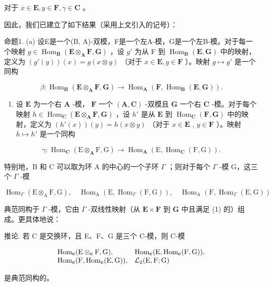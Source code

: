 对于 \(x \in \mathbf{E}, y \in \mathbf{F}, \gamma \in \mathbf{C}\) 。

因此，我们已建立了如下结果（采用上文引入的记号）：

命题1. (a) 设E是一个(B, A)-双模，F是一个左A-模，G是一个左B-模。对于每一个映射 \(g \in \operatorname{Hom}_{\mathbf{B}}(\mathbf{E} \otimes_{\mathbf{A}} \mathbf{F}, \mathbf{G})\) ，设 \(g'\) 为从 F 到 \(\operatorname{Hom}_{\mathbf{B}}(\mathbf{E}, \mathbf{G})\) 中的映射，定义为 \((g'(y))(x) = g(x \otimes y)\) （对于 \(x \in \mathbf{E}, y \in \mathbf{F}\) ）。映射 \(g \mapsto g'\) 是一个同构

\[
\beta : \operatorname{Hom} _ {\mathbf {B}} (\mathbf {E} \otimes_ {\mathbf {A}} \mathbf {F}, \mathbf {G}) \rightarrow \operatorname{Hom} _ {\mathbf {A}} (\mathbf {F}, \operatorname{Hom} _ {\mathbf {B}} (\mathbf {E}, \mathbf {G})).\tag{5}
\]

\begin{enumerate}
\def\labelenumi{(\alph{enumi})}
\setcounter{enumi}{1}
\tightlist
\item
  设 \(\mathbf{E}\) 为一个右 \(\mathbf{A}\) -模， \(\mathbf{F}\) 一个 \((\mathbf{A}, \mathbf{C})\) -双模且 \(\mathbf{G}\) 一个右 \(\mathbf{C}\) -模。对于每个映射 \(h \in \operatorname{Hom}_{\mathbf{C}}(\mathbf{E} \otimes_{\mathbf{A}} \mathbf{F}, \mathbf{G})\) ，设 \(h'\) 是从 \(\mathbf{E}\) 到 \(\operatorname{Hom}_{\mathbf{C}}(\mathbf{F}, \mathbf{G})\) 中的映射，定义为 \((h'(x))(y) = h(x \otimes y)\) （对于 \(x \in \mathbf{E}\) , \(y \in \mathbf{F}\) ）。映射 \(h \mapsto h'\) 是一个同构
\end{enumerate}

\[
\gamma : \operatorname{Hom} _ {\mathbf {C}} (\mathrm{E} \otimes_ {\mathbf {A}} \mathrm{F}, \mathrm{G}) \rightarrow \operatorname{Hom} _ {\mathbf {A}} (\mathrm{E}, \operatorname{Hom} _ {\mathbf {C}} (\mathrm{F}, \mathrm{G})).\tag{6}
\]

特别地，B 和 C 可以取为环 A 的中心的一个子环 \(\Gamma\) ；则对于每个 \(\Gamma\) -模 G，这三个 \(\Gamma\) -模

\[
\operatorname{Hom} _ {\Gamma} (\mathrm{E} \otimes_ {\mathrm{A}} \mathrm{F}, \mathrm{G}), \quad \operatorname{Hom} _ {\mathrm{A}} (\mathrm{E}, \operatorname{Hom} _ {\Gamma} (\mathrm{F}, \mathrm{G})), \quad \operatorname{Hom} _ {\mathrm{A}} (\mathrm{F}, \operatorname{Hom} _ {\Gamma} (\mathrm{E}, \mathrm{G}))
\]

典范同构于 \(\Gamma\) -模，它由 \(\Gamma\) -双线性映射（从 \(\mathbf{E} \times \mathbf{F}\) 到 \(\mathbf{G}\) 中且满足 (1) 的）组成。更具体地说：

推论. 若 C 是交换环，且 E、F、G 是三个 C-模，则 C-模

\[
\begin{array}{l l} \operatorname{Hom} _ {\mathbf {c}} (\mathrm{E} \otimes_ {\mathbf {c}} \mathrm{F}, \mathrm{G}), & \operatorname{Hom} _ {\mathbf {c}} (\mathrm{E}, \operatorname{Hom} _ {\mathbf {c}} (\mathrm{F}, \mathrm{G})), \\ \operatorname{Hom} _ {\mathbf {c}} (\mathrm{F}, \operatorname{Hom} _ {\mathbf {c}} (\mathrm{E}, \mathrm{G})), & \mathcal {L} _ {2} (\mathrm{E}, \mathrm{F}; \mathrm{G}) \end{array}
\]

是典范同构的。
\relax{}
